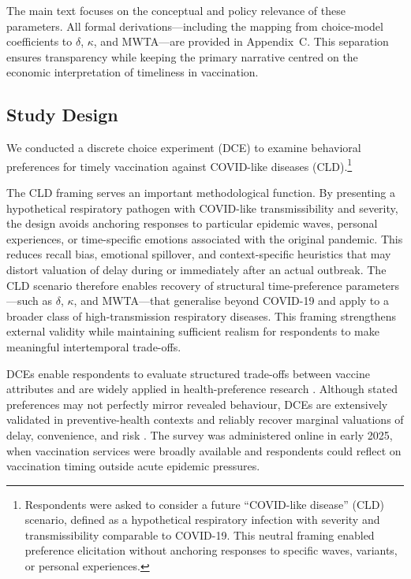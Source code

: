 \documentclass[preprint,12pt]{elsarticle}
\begin{document}
The main text focuses on the conceptual and policy relevance of these parameters. All formal 
derivations—including the mapping from choice-model coefficients to $\delta$, 
$\kappa$, and MWTA—are provided in Appendix~C. This separation ensures transparency 
while keeping the primary narrative centred on the economic interpretation of timeliness in 
vaccination.

\subsection{Study Design}

We conducted a discrete choice experiment (DCE) to examine behavioral preferences for timely 
vaccination against COVID-like diseases (CLD).\footnote{Respondents were asked to consider a 
future “COVID-like disease” (CLD) scenario, defined as a hypothetical respiratory infection with 
severity and transmissibility comparable to COVID-19. This neutral framing enabled preference 
elicitation without anchoring responses to specific waves, variants, or personal experiences.} 


The CLD framing serves an important methodological function. By presenting a hypothetical 
respiratory pathogen with COVID-like transmissibility and severity, the design avoids anchoring 
responses to particular epidemic waves, personal experiences, or time-specific emotions 
associated with the original pandemic. This reduces recall bias, emotional spillover, and 
context-specific heuristics that may distort valuation of delay during or immediately after an 
actual outbreak. The CLD scenario therefore enables recovery of structural time-preference 
parameters—such as $\delta$, $\kappa$, and MWTA—that generalise beyond COVID-19 and 
apply to a broader class of high-transmission respiratory diseases. This framing strengthens 
external validity while maintaining sufficient realism for respondents to make meaningful 
intertemporal trade-offs.


DCEs enable respondents to evaluate structured trade-offs between vaccine attributes and are widely applied in health-preference research \cite{Louviere2000,Hensher2015}. Although stated preferences may not perfectly mirror revealed behaviour, DCEs are extensively validated in preventive-health contexts and reliably recover marginal valuations of delay, convenience, and risk \cite{Louviere2000,Hensher2015,Johnson2013}.
 The survey was 
administered online in early 2025, when vaccination services were broadly available and respondents 
could reflect on vaccination timing outside acute epidemic pressures.
\end{document}
